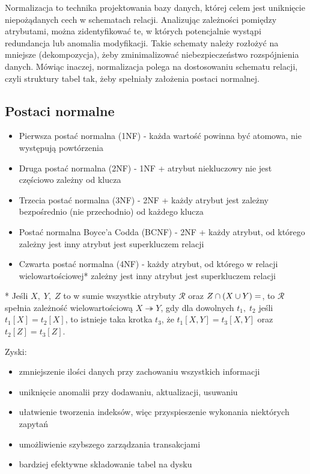 Normalizacja to technika projektowania bazy danych, której celem jest uniknięcie niepożądanych cech w schematach relacji. Analizując zależności pomiędzy atrybutami, można zidentyfikować te, w których potencjalnie wystąpi redundancja lub anomalia modyfikacji.
Takie schematy należy rozłożyć na mniejsze (dekompozycja), żeby zminimalizować niebezpieczeństwo rozspójnienia danych. Mówiąc inaczej, normalizacja polega na dostosowaniu schematu relacji, czyli struktury tabel tak, żeby spełniały założenia postaci normalnej.

\subsection*{Postaci normalne}
\begin{itemize}
    \item Pierwsza postać normalna (1NF) - każda wartość powinna być atomowa, nie występują powtórzenia
    \item Druga postać normalna (2NF) - 1NF + atrybut niekluczowy nie jest częściowo zależny od klucza
    \item Trzecia postać normalna (3NF) - 2NF + każdy atrybut jest zależny bezpośrednio (nie przechodnio) od każdego klucza
    \item Postać normalna Boyce'a Codda (BCNF) - 2NF + każdy atrybut, od którego zależny jest inny atrybut jest superkluczem relacji
    \item Czwarta postać normalna (4NF) - każdy atrybut, od którego w relacji wielowartościowej* zależny jest inny atrybut jest superkluczem relacji 
\end{itemize}
* Jeśli \( X,\;Y,\;Z \) to w sumie wszystkie atrybuty \( \mathcal{R} \) oraz \( Z \cap (X \cup Y) = \empty \), to \( \mathcal{R} \) spełnia zależność wielowartościową \( X \twoheadrightarrow Y \),
gdy dla dowolnych \( t_1,\; t_2 \) jeśli \( t_1[X] = t_2[X] \), to istnieje taka krotka \( t_3 \), że \( t_1[X, Y] = t_3[X, Y] \) oraz \( t_2[Z] = t_3[Z] \).


Zyski:
\begin{itemize}
    \item zmniejszenie ilości danych przy zachowaniu wszystkich informacji
    \item uniknięcie anomalii przy dodawaniu, aktualizacji, usuwaniu
    \item ułatwienie tworzenia indeksów, więc przyspieszenie wykonania niektórych zapytań
    \item umożliwienie szybszego zarządzania transakcjami
    \item bardziej efektywne składowanie tabel na dysku
\end{itemize}